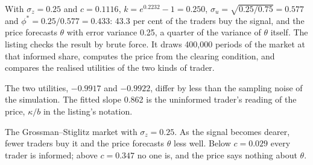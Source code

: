 With $\sigma_z = 0.25$ and $c = 0.1116$, $k = e^{0.2232} - 1 = 0.250$, $\sigma_u = \sqrt{0.25/0.75} = 0.577$
and $\phi^* = 0.25/0.577 = 0.433$: 43.3 per cent of the traders buy the signal, and the price forecasts
$\theta$ with error variance 0.25, a quarter of the variance of $\theta$ itself. The listing checks the
result by brute force. It draws 400{,}000 periods of the market at that informed share, computes the
price from the clearing condition, and compares the realised utilities of the two kinds of trader.

\label{lst:b2:prices-as-information:informed-share}

\label{out:b2:prices-as-information:informed-share}

The two utilities, $-0.9917$ and $-0.9922$, differ by less than the sampling noise of the simulation. The
fitted slope 0.862 is the uninformed trader's reading of the price, $\kappa/b$ in the listing's notation.

\begin{omfigure}

{\small The Grossman--Stiglitz market with $\sigma_z = 0.25$. As the signal becomes dearer, fewer traders
buy it and the price forecasts $\theta$ less well. Below $c = 0.029$ every trader is informed; above $c =
0.347$ no one is, and the price says nothing about $\theta$.}
\end{omfigure}

